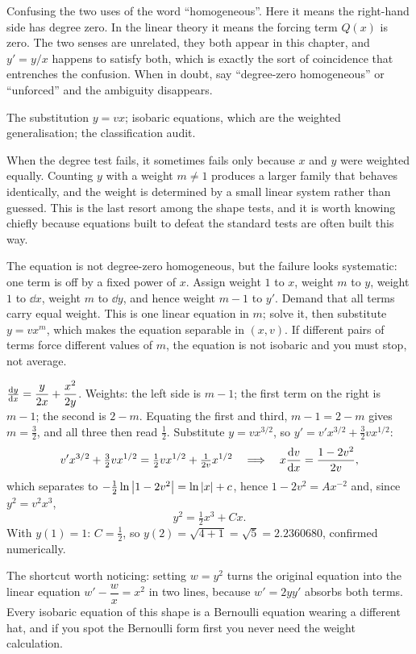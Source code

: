 \begin{trap}
Confusing the two uses of the word ``homogeneous''. Here it means the right-hand side has degree zero. In the linear theory it means the forcing term $Q(x)$ is zero. The two senses are unrelated, they both appear in this chapter, and $y'=y/x$ happens to satisfy both, which is exactly the sort of coincidence that entrenches the confusion. When in doubt, say ``degree-zero homogeneous'' or ``unforced'' and the ambiguity disappears.
\end{trap}

\begin{seealsob}The substitution $y=vx$; isobaric equations, which are the weighted generalisation; the classification audit.\end{seealsob}

When the degree test fails, it sometimes fails only because $x$ and $y$ were weighted equally. Counting $y$ with a weight $m\neq1$ produces a larger family that behaves identically, and the weight is determined by a small linear system rather than guessed. This is the last resort among the shape tests, and it is worth knowing chiefly because equations built to defeat the standard tests are often built this way.

\cue The equation is not degree-zero homogeneous, but the failure looks systematic: one term is off by a fixed power of $x$. Assign weight $1$ to $x$, weight $m$ to $y$, weight $1$ to $\dd x$, weight $m$ to $\dd y$, and hence weight $m-1$ to $y'$.
\method Demand that all terms carry equal weight. This is one linear equation in $m$; solve it, then substitute $y=vx^{m}$, which makes the equation separable in $(x,v)$. If different pairs of terms force different values of $m$, the equation is not isobaric and you must stop, not average.

\begin{worked}
$\frac{\mathrm{d}y}{\mathrm{d}x}=\dfrac{y}{2x}+\dfrac{x^{2}}{2y}$. Weights: the left side is $m-1$; the first term on the right is $m-1$; the second is $2-m$. Equating the first and third, $m-1=2-m$ gives $m=\tfrac32$, and all three then read $\tfrac12$. Substitute $y=vx^{3/2}$, so $y'=v'x^{3/2}+\tfrac32vx^{1/2}$:
\[v'x^{3/2}+\tfrac32vx^{1/2}=\tfrac12vx^{1/2}+\tfrac{1}{2v}x^{1/2}\quad\Longrightarrow\quad x\frac{\mathrm{d}v}{\mathrm{d}x}=\frac{1-2v^{2}}{2v},\]
which separates to $-\tfrac12\ln\left\lvert 1-2v^{2}\right\rvert=\ln\left\lvert x\right\rvert+c$, hence $1-2v^{2}=Ax^{-2}$ and, since $y^{2}=v^{2}x^{3}$,
\[y^{2}=\tfrac12x^{3}+Cx.\]
With $y(1)=1$: $C=\tfrac12$, so $y(2)=\sqrt{4+1}=\sqrt5=2.2360680$, confirmed numerically.

The shortcut worth noticing: setting $w=y^{2}$ turns the original equation into the linear equation $w'-\dfrac{w}{x}=x^{2}$ in two lines, because $w'=2yy'$ absorbs both terms. Every isobaric equation of this shape is a Bernoulli equation wearing a different hat, and if you spot the Bernoulli form first you never need the weight calculation.
\end{worked}

